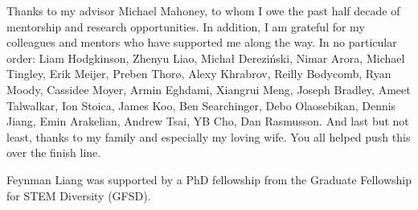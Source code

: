 \documentclass[oldfontcommands]{ucbthesis}
\numberwithin{theorem}{chapter}
\numberwithin{example}{chapter}
\numberwithin{condition}{chapter}
\numberwithin{property}{chapter}
\numberwithin{lemma}{chapter}
\numberwithin{proposition}{chapter}
\numberwithin{remark}{chapter}
\numberwithin{corollary}{chapter}
\numberwithin{definition}{chapter}
\numberwithin{conjecture}{chapter}
\numberwithin{axiom}{chapter}
\numberwithin{claim}{chapter}
\numberwithin{assumption}{chapter}
\numberwithin{condition}{chapter}
\numberwithin{question}{chapter}
\begin{document}
\begin{frontmatter}

  \begin{dedication}
    \null\vfil
    \begin{center}
      Thanks to my advisor Michael Mahoney, to whom I owe the past half decade
      of mentorship and research opportunities. In addition, I am grateful for my colleagues and mentors who have supported me along the way. In no particular order:
      Liam Hodgkinson, Zhenyu Liao, Micha{\l} Derezi\'{n}ski, Nimar Arora, Michael Tingley,
      Erik Meijer, Preben Thor\o , Alexy Khrabrov, Reilly Bodycomb, Ryan Moody, Cassidee Moyer, Armin Eghdami, Xiangrui Meng, Joseph Bradley,
      Ameet Talwalkar, Ion Stoica, James Koo, Ben Searchinger, Debo Olaosebikan, Dennis Jiang, Emin Arakelian, Andrew Tsai, YB Cho, Dan Rasmusson. And last but not least,
      thanks to my family and especially my loving
      wife. You all helped push this over the finish line.
    \end{center}
    \vfil\null
  \end{dedication}


  \tableofcontents

  \begin{acknowledgements}
    Feynman Liang was supported by a PhD fellowship from the Graduate Fellowship for STEM Diversity (GFSD).
  \end{acknowledgements}
\end{frontmatter}

\pagestyle{headings}








\end{document}
